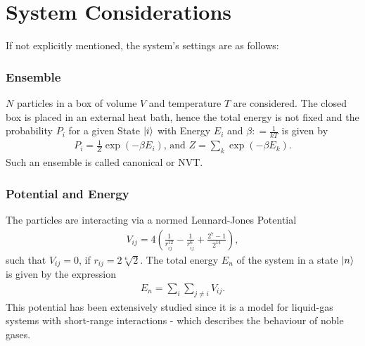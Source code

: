 \section{System Considerations}
If not explicitly mentioned, the system's settings are as follows:
\subsubsection*{Ensemble}
$N$ particles in a box of volume $V$ and temperature $T$ are considered.
The closed box is placed in an external heat bath, hence the total energy is not fixed and the probability $P_i$ for a given State $\ket{i}$ with Energy $E_i$ and $\beta \mathrel{\mathop:}= \frac{1}{kT}$ is given by
\begin{align}
	P_i = \frac{1}{Z}\exp\left(-\beta E_i\right)\text{, and }
	Z = \sum_k \exp\left(-\beta E_k\right).
\end{align}
Such an ensemble is called canonical or NVT.

\subsubsection*{Potential and Energy}
The particles are interacting via a normed Lennard-Jones Potential
\begin{align}
\label{LJPot}
	V_{ij} = 4\left(\frac{1}{r_{ij}^{12}} - \frac{1}{r_{ij}^6} + \frac{2^7 - 1}{2^{14}}\right),
\end{align}
such that $V_{ij}=0$, if $r_{ij} = 2\sqrt[6]2$.
The total energy $E_n$ of the system in a state $\ket{n}$ is given by the expression
\begin{align}
	E_n = \sum_i\sum_{j\neq i}V_{ij}.
\end{align}
This potential has been extensively studied since it is a model for liquid-gas systems with short-range interactions - which describes the behaviour of noble gases.
\newpage

